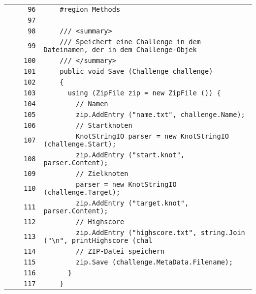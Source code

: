 \documentclass[a4paper,10pt]{article}
\begin{document}
\begin{longtable}[l]{lrrl}
\cellcolor{gray} &  & \verb~96~ & \verb~    #region Methods~\\
\cellcolor{gray} &  & \verb~97~ & \verb~~\\
\cellcolor{gray} &  & \verb~98~ & \verb~    /// <summary>~\\
\cellcolor{gray} &  & \verb~99~ & \verb~    /// Speichert eine Challenge in dem Dateinamen, der in dem Challenge-Objek~\\
\cellcolor{gray} &  & \verb~100~ & \verb~    /// </summary>~\\
\cellcolor{gray} &  & \verb~101~ & \verb~    public void Save (Challenge challenge)~\\
\cellcolor{gray} &  & \verb~102~ & \verb~    {~\\
\cellcolor{gray} &  & \verb~103~ & \verb~      using (ZipFile zip = new ZipFile ()) {~\\
\cellcolor{gray} &  & \verb~104~ & \verb~        // Namen~\\
\cellcolor{gray} &  & \verb~105~ & \verb~        zip.AddEntry ("name.txt", challenge.Name);~\\
\cellcolor{gray} &  & \verb~106~ & \verb~        // Startknoten~\\
\cellcolor{gray} &  & \verb~107~ & \verb~        KnotStringIO parser = new KnotStringIO (challenge.Start);~\\
\cellcolor{gray} &  & \verb~108~ & \verb~        zip.AddEntry ("start.knot", parser.Content);~\\
\cellcolor{gray} &  & \verb~109~ & \verb~        // Zielknoten~\\
\cellcolor{gray} &  & \verb~110~ & \verb~        parser = new KnotStringIO (challenge.Target);~\\
\cellcolor{gray} &  & \verb~111~ & \verb~        zip.AddEntry ("target.knot", parser.Content);~\\
\cellcolor{gray} &  & \verb~112~ & \verb~        // Highscore~\\
\cellcolor{gray} &  & \verb~113~ & \verb~        zip.AddEntry ("highscore.txt", string.Join ("\n", printHighscore (chal~\\
\cellcolor{gray} &  & \verb~114~ & \verb~        // ZIP-Datei speichern~\\
\cellcolor{gray} &  & \verb~115~ & \verb~        zip.Save (challenge.MetaData.Filename);~\\
\cellcolor{gray} &  & \verb~116~ & \verb~      }~\\
\cellcolor{gray} &  & \verb~117~ & \verb~    }~\\

\end{longtable}
\end{document}
